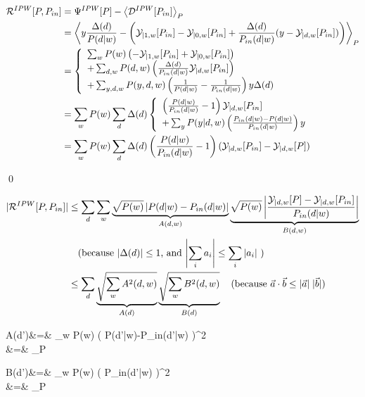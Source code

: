 \begin{align}
{\cal R}^{IPW}[P,P_{in}]
&=
\Psi^{IPW}[P]
-\left\langle{\cal D}^{IPW}[P_{in}]\right\rangle_P
\\
&=
\left\langle
y \frac{\Delta(d)}{P(d|w)}
-
\left(
{\cal Y}_{|1,w}[P_{in}]
-
{\cal Y}_{|0,w}[P_{in}]
+
\frac{\Delta(d)}{P_{in}(d|w)}
(y-{\cal Y}_{|d,w}[P_{in}])
\right)
\right\rangle_{P}
\\
&=
\left\{
\begin{array}{l}
\sum_w P(w)\left(
-{\cal Y}_{|1,w}[P_{in}]
+
{\cal Y}_{|0,w}[P_{in}]
\right)
\\
+\sum_{d,w} P(d,w) \left(
\frac{\Delta(d)}{P_{in}(d|w)}
{\cal Y}_{|d,w}[P_{in}]
\right)
\\
+\sum_{y,d,w} P(y, d,w)\left(
\frac{1}{P(d|w)}- \frac{1}{P_{in}(d|w)}
\right) y\Delta(d)
\end{array}
\right.
\\
&=\sum_w P(w)\sum_d \Delta(d)
\left\{
\begin{array}{l}
\left(
\frac{P(d|w)}{P_{in}(d|w)}-1
\right)
{\cal Y}_{|d,w}[P_{in}]
\\
+\sum_{y}P(y|d,w)\left(
\frac{P_{in}(d|w)-P(d|w)}{P_{in}(d|w)}
\right) y
\end{array}
\right.
\\
&=
\sum_w P(w)\sum_d \Delta(d)
\left(\frac{P(d|w)}{P_{in}(d|w)}-1
\right)
({\cal Y}_{|d,w}[P_{in}]-
{\cal Y}_{|d,w}[P])
\end{align}

\qed


\begin{align}
|{\cal R}^{IPW}[P,P_{in}]|&\leq
\sum_d \sum_w
\underbrace{\sqrt{P(w)}
\left|
P(d|w)-P_{in}(d|w)
\right|}_{A(d,w)}
\underbrace{\sqrt{P(w)}
\left|
\frac{
{\cal Y}_{|d,w}[P]-{\cal Y}_{|d,w}[P_{in}]}
{P_{in}(d|w)}
\right|}_{B(d,w)}
\nonumber
\\&
\quad\text{(because
$|\Delta(d)|\leq 1$, and $\left|\sum_i a_i\right|\leq \sum_i |a_i|$ )}
\\
&\leq
\sum_d
\underbrace{\sqrt{\sum_w A^2(d,w)}}_{A(d)}
\underbrace{\sqrt{\sum_w B^2(d,w)}}_{B(d)}
\quad \text{(because ${\vec{a}}\cdot {\vec{b}}\leq |{\vec{a}}|\;|{\vec{b}}|$)}
\end{align}

\beqa
A(d')&=&
\sum_w P(w)
\left(
P(d'|w)-P_{in}(d'|w)
\right)^2
\\
&=&
_P
\eeqa

\beqa
B(d')&=&
\sum_w P(w)
\left(
{P_{in}(d'|w)}
\right)^2
\\
&=&
_P
\eeqa

